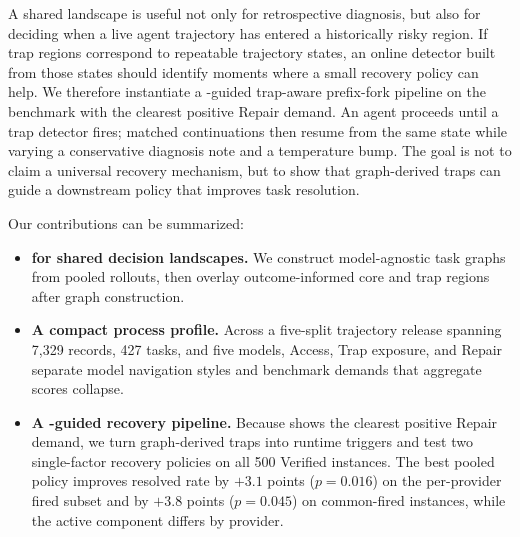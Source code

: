 A shared landscape is useful not only for retrospective diagnosis, but also for deciding when a live agent trajectory has entered a historically risky region.
If trap regions correspond to repeatable trajectory states, an online detector built from those states should identify moments where a small recovery policy can help.
We therefore instantiate a \method{}-guided trap-aware prefix-fork pipeline on the benchmark with the clearest positive Repair demand.
An agent proceeds until a trap detector fires; matched continuations then resume from the same state while varying a conservative diagnosis note and a temperature bump.
The goal is not to claim a universal recovery mechanism, but to show that graph-derived traps can guide a downstream policy that improves task resolution.

Our contributions can be summarized:
\begin{itemize}
\item \textbf{\method{} for shared decision landscapes.}
We construct model-agnostic task graphs from pooled rollouts, then overlay outcome-informed core and trap regions after graph construction.
\item \textbf{A compact process profile.}
Across a five-split trajectory release spanning 7,329 records, 427 tasks, and five models, Access, Trap exposure, and Repair separate model navigation styles and benchmark demands that aggregate scores collapse.
\item \textbf{A \method{}-guided recovery pipeline.}
Because \swe{} shows the clearest positive Repair demand, we turn graph-derived traps into runtime triggers and test two single-factor recovery policies on all 500 \swe{} Verified instances. The best pooled policy improves resolved rate by $+3.1$ points ($p{=}0.016$) on the per-provider fired subset and by $+3.8$ points ($p{=}0.045$) on common-fired instances, while the active component differs by provider.
\end{itemize}
